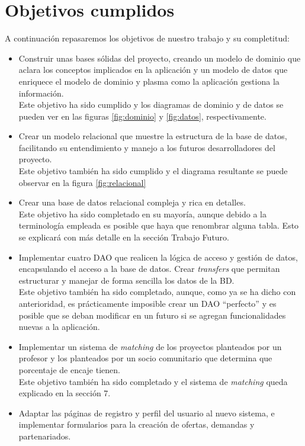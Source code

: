 \documentclass[11pt]{book}
\begin{document}
\section{Objetivos cumplidos}
A continuación repasaremos los objetivos de nuestro trabajo y su completitud:
\begin{itemize}
	\item Construir unas bases sólidas del proyecto, creando un modelo de dominio que aclara los conceptos implicados en la aplicación y un modelo de datos que enriquece el modelo de dominio y plasma como la aplicación gestiona la información.\\
	Este objetivo ha sido cumplido y los diagramas de dominio y de datos se pueden ver en las figuras \ref{fig:dominio} y \ref{fig:datos}, respectivamente.
	\item Crear un modelo relacional que muestre la estructura de la base de datos, facilitando su entendimiento y manejo a los futuros desarrolladores del proyecto.\\
	Este objetivo también ha sido cumplido y el diagrama resultante se puede observar en la figura \ref{fig:relacional}
	\item Crear una base de datos relacional compleja y rica en detalles. \\
	Este objetivo ha sido completado en su mayoría, aunque debido a la terminología empleada es posible que haya que renombrar alguna tabla. Esto se explicará con más detalle en la sección Trabajo Futuro.
	\item Implementar cuatro DAO que realicen la lógica de acceso y gestión de datos, encapsulando el acceso a la base de datos. Crear \emph{transfers} que permitan estructurar y manejar de forma sencilla los datos de la BD. \\
	Este objetivo también ha sido completado, aunque, como ya se ha dicho con anterioridad, es prácticamente imposible crear un DAO ``perfecto'' y es posible que se deban modificar en un futuro si se agregan funcionalidades nuevas a la aplicación.
	\item Implementar un sistema de \emph{matching} de los proyectos planteados por un profesor y los planteados por un socio comunitario que determina que porcentaje de encaje tienen. \\
	Este objetivo también ha sido completado y el sistema de \emph{matching} queda explicado en la sección 7.
	\item Adaptar las páginas de registro y perfil del usuario al nuevo sistema, e implementar formularios para la creación de ofertas, demandas y partenariados. \\

\end{itemize}
\end{document}
